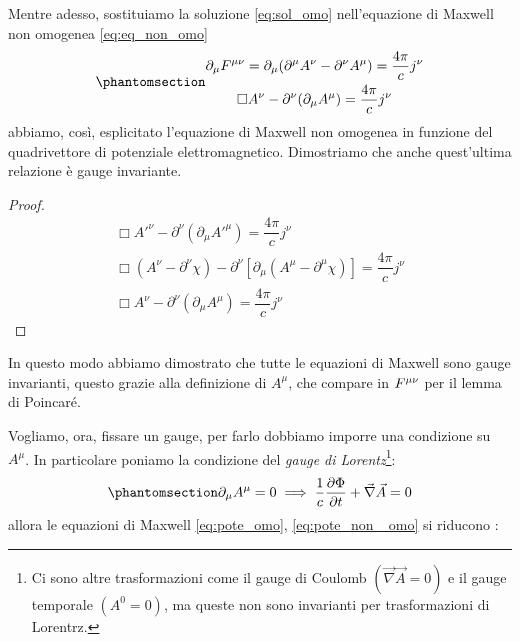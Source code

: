 Mentre adesso, sostituiamo la soluzione \eqref{eq:sol_omo} nell'equazione di Maxwell non omogenea \eqref{eq:eq_non_omo}
\begin{equation}\phantomsection\label{eq:pote_non _omo}
    \begin{gathered}
        \partial_\mu F\indices{^{\mu \nu}}=\partial_\mu(\partial^\mu A^\nu -\partial^\nu A^\mu)=\dfrac{4\pi}{c}j^\nu\\
\Box A^\nu -\partial^\nu(\partial_\mu A^\mu)=\dfrac{4\pi}{c}j^\nu
    \end{gathered}
    \end{equation}
abbiamo, così, esplicitato l'equazione di Maxwell non omogenea in funzione del quadrivettore di potenziale elettromagnetico.
Dimostriamo che anche quest'ultima relazione è gauge invariante.
\begin{proof}
\begin{equation}
\begin{gathered}
       \Box A'^\nu -\partial^\nu(\partial_\mu A'^\mu)=\dfrac{4\pi}{c}j^\nu\\
        \Box (A^\nu-\partial^\nu \chi) -\partial^\nu\left[\partial_\mu (A^\mu-\partial^\mu \chi)\right]=\dfrac{4\pi}{c}j^\nu\\
        \Box A^\nu -\partial^\nu(\partial_\mu A^\mu)=\dfrac{4\pi}{c}j^\nu
\end{gathered}
\end{equation}
\end{proof}
In questo modo abbiamo dimostrato che tutte le equazioni di Maxwell sono gauge invarianti, questo grazie alla definizione di $A^\mu$, che compare in $F\indices{^{\mu\nu}}$ per il lemma di Poincaré.

Vogliamo, ora, fissare un gauge, per farlo dobbiamo imporre una condizione su $A^\mu$. In particolare poniamo la condizione del \textit{gauge di Lorentz}\footnote{Ci sono altre trasformazioni come il gauge di Coulomb $(\Vec{\nabla}\Vec{A}=0)$ e il gauge temporale $(A^0=0)$, ma queste non sono invarianti per trasformazioni di Lorentrz.}:
\begin{equation}\phantomsection\label{eq:gauge_lorentz}
    \partial_\mu A^\mu=0 \implies\dfrac{1}{c}\dfrac{\partial \Phi}{\partial t}+ \Vec{\nabla}\Vec{A}=0
\end{equation}
 allora le equazioni di Maxwell \eqref{eq:pote_omo}, \eqref{eq:pote_non _omo} si riducono   :


